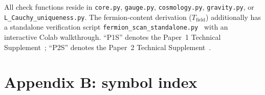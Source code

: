 \documentclass[11pt]{article}
\begin{document}
All check functions reside in \texttt{core.py}, \texttt{gauge.py}, \texttt{cosmology.py}, \texttt{gravity.py}, or \texttt{L\_Cauchy\_uniqueness.py}.  The fermion-content derivation ($T_{\mathrm{field}}$) additionally has a standalone verification script \texttt{fermion\_scan\_standalone.py}~\cite{BrookeFermionScan} with an interactive Colab walkthrough.  ``P1S'' denotes the Paper~1 Technical Supplement~\cite{BrookeSupplement}; ``P2S'' denotes the Paper~2 Technical Supplement~\cite{BrookeP2Supplement}.


\section{Appendix B: symbol index}
\label{app:symbols}
\end{document}
